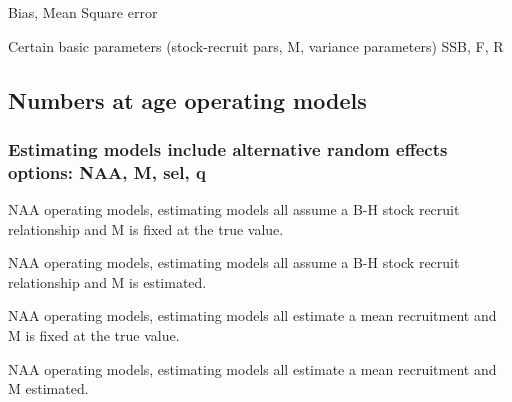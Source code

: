 \documentclass[
  12pt,
]{article}
\begin{document}
Bias, Mean Square error

Certain basic parameters (stock-recruit pars, M, variance parameters)
SSB, F, R

\clearpage

\hypertarget{numbers-at-age-operating-models}{%
\subsection{Numbers at age operating
models}\label{numbers-at-age-operating-models}}

\hypertarget{estimating-models-include-alternative-random-effects-options-naa-m-sel-q}{%
\subsubsection{Estimating models include alternative random effects
options: NAA, M, sel,
q}\label{estimating-models-include-alternative-random-effects-options-naa-m-sel-q}}

\clearpage

\begin{table}
\caption{NAA operating models, estimating models all assume a B-H stock recruit relationship and M is fixed at the true value.}
{}
\end{table}

\begin{table}
\caption{NAA operating models, estimating models all assume a B-H stock recruit relationship and M is estimated.}
{}
\end{table}

\begin{table}
\caption{NAA operating models, estimating models all estimate a mean recruitment and M is fixed at the true value.}
{}
\end{table}

\begin{table}
\caption{NAA operating models, estimating models all estimate a mean recruitment and M estimated.}
{}
\end{table}
\clearpage
\end{document}

